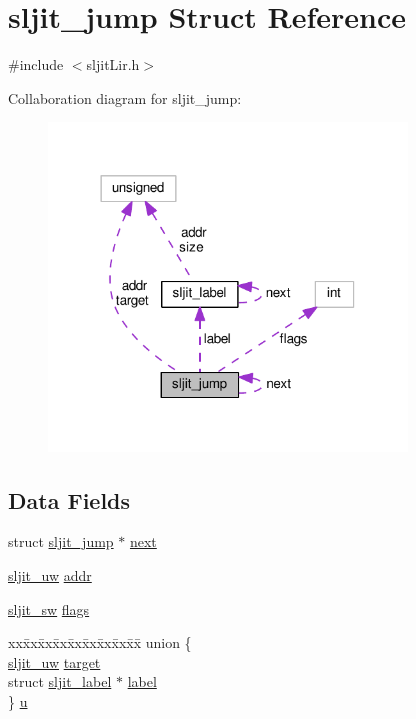 \hypertarget{structsljit__jump}{}\section{sljit\+\_\+jump Struct Reference}
\label{structsljit__jump}


{\ttfamily \#include $<$sljit\+Lir.\+h$>$}



Collaboration diagram for sljit\+\_\+jump\+:
\nopagebreak
\begin{figure}[H]
\begin{center}
\leavevmode
\includegraphics[width=270pt]{structsljit__jump__coll__graph}
\end{center}
\end{figure}
\subsection*{Data Fields}
\begin{DoxyCompactItemize}
\item 
struct \hyperlink{structsljit__jump}{sljit\+\_\+jump} $\ast$ \hyperlink{structsljit__jump_aa78d774bdb423e0b3b1ee1e847d89426}{next}
\item 
\hyperlink{sljitConfigInternal_8h_a4f2aa7461612a199a0e3fd93cd9a4d02}{sljit\+\_\+uw} \hyperlink{structsljit__jump_a28c6a2ef6479ef9fde0614a581978da2}{addr}
\item 
\hyperlink{sljitConfigInternal_8h_af8684c8d224c0d4e1edd560289d24e6f}{sljit\+\_\+sw} \hyperlink{structsljit__jump_af7b98287c3644a5b6b9f16ad8832a02b}{flags}
\item 
\begin{tabbing}
xx\=xx\=xx\=xx\=xx\=xx\=xx\=xx\=xx\=\kill
union \{\\
\>\hyperlink{sljitConfigInternal_8h_a4f2aa7461612a199a0e3fd93cd9a4d02}{sljit\_uw} \hyperlink{structsljit__jump_ae39bd9b8d51ff6457799ebfa44140558}{target}\\
\>struct \hyperlink{structsljit__label}{sljit\_label} $\ast$ \hyperlink{structsljit__jump_a933b101e96dd72530a373e37ad8cf320}{label}\\
\} \hyperlink{structsljit__jump_a1aa68323d426c90b4359285a35b5a414}{u}\\

\end{tabbing}\end{DoxyCompactItemize}


